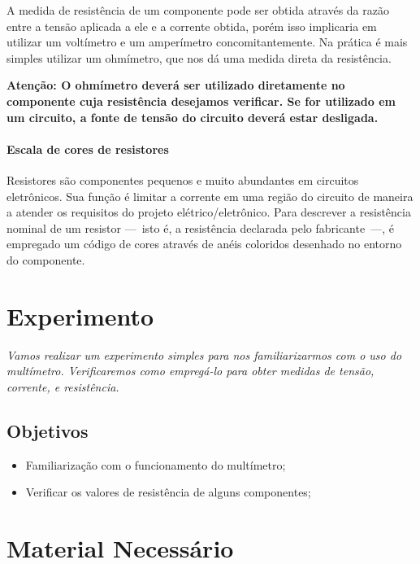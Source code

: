 A medida de resistência de um componente pode ser obtida através da razão entre a tensão aplicada a ele e a corrente obtida, porém isso implicaria em utilizar um voltímetro e um amperímetro concomitantemente. Na prática é mais simples utilizar um ohmímetro, que nos dá uma medida direta da resistência.

\textbf{Atenção: O ohmímetro deverá ser utilizado diretamente no componente cuja resistência desejamos verificar. Se for utilizado em um circuito, a fonte de tensão do circuito deverá estar desligada.}

\paragraph{Escala de cores de resistores}

Resistores são componentes pequenos e muito abundantes em circuitos eletrônicos. Sua função é limitar a corrente em uma região do circuito de maneira a atender os requisitos do projeto elétrico/eletrônico. Para descrever a resistência nominal de um resistor ---~isto é, a resistência declarada pelo fabricante~---, é empregado um código de cores através de anéis coloridos desenhado no entorno do componente.

\section{Experimento}

\emph{Vamos realizar um experimento simples para nos familiarizarmos com o uso do multímetro. Verificaremos como empregá-lo para obter medidas de tensão, corrente, e resistência.}

\subsection{Objetivos}

\begin{itemize}
	\item Familiarização com o funcionamento do multímetro;
	\item Verificar os valores de resistência de alguns componentes;
\end{itemize}

\section{Material Necessário}

